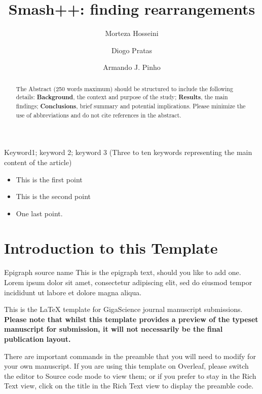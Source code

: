 \documentclass[a4paper,num-refs]{oup-contemporary}
\title{Smash++: finding rearrangements}
\author[1,\authfn{1}]{Morteza Hosseini}
\author[2,\authfn{1}]{Diogo Pratas}
\author[2,\authfn{1}]{Armando J. Pinho}
\affil[1,2]{IEETA/DETI, University of Aveiro, Portugal}
\begin{document}
\begin{frontmatter}
\maketitle
\begin{abstract}
The Abstract (250 words maximum) should be structured to include the following details: \textbf{Background}, the context and purpose of the study; \textbf{Results}, the main findings; \textbf{Conclusions}, brief summary and potential implications. Please minimize the use of abbreviations and do not cite references in the abstract.
\end{abstract}

\begin{keywords}
Keyword1; keyword 2; keyword 3 (Three to ten keywords representing the main content of the article)
\end{keywords}
\end{frontmatter}

\begin{keypoints*}
\begin{itemize}
\item This is the first point
\item This is the second point
\item One last point.
\end{itemize}
\end{keypoints*}

\section{Introduction to this Template}

\begin{epigraph}{Epigraph source name}
This is the epigraph text, should you like to add one. Lorem ipsum dolor sit amet, consectetur adipiscing elit, sed do eiusmod tempor incididunt ut labore et dolore magna aliqua. 
\end{epigraph}

This is the \LaTeX{} template for GigaScience journal manuscript submissions. \textbf{Please note that whilst this template provides a preview of the typeset manuscript for submission, it will not necessarily be the final publication layout.}

There are important commands in the preamble that you will need to modify for your own manuscript. If you are using this template on Overleaf, please switch the editor to Source code mode to view them; or if you prefer to stay in the Rich Text view, click on the title in the Rich Text view to display the preamble code.
\end{document}

